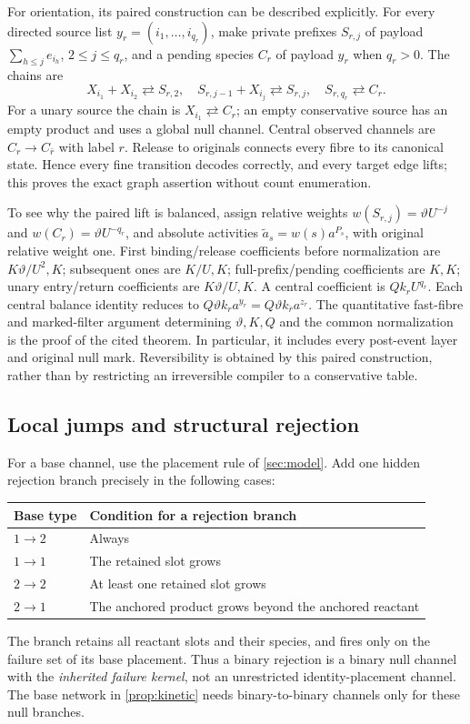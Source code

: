 \documentclass[11pt]{article}
\numberwithin{equation}{section}
\theoremstyle{definition}
\theoremstyle{remark}\newtheorem{remark}[theorem]{Remark}
\begin{document}
For orientation, its paired construction can be described explicitly.
For every directed source list $y_r=(i_1,\ldots,i_{q_r})$, make private
prefixes $S_{r,j}$ of payload $\sum_{h\le j}e_{i_h}$, $2\le j\le q_r$,
and a pending species $C_r$ of payload $y_r$ when $q_r>0$. The chains are
\[
 X_{i_1}+X_{i_2}\rightleftarrows S_{r,2},\quad
 S_{r,j-1}+X_{i_j}\rightleftarrows S_{r,j},\quad
 S_{r,q_r}\rightleftarrows C_r.
\]
For a unary source the chain is $X_{i_1}\rightleftarrows C_r$; an empty
conservative source has an empty product and uses a global null channel.
Central observed channels are $C_r\to C_{\bar r}$ with label $r$.
Release to originals connects every fibre to its canonical state.
Hence every fine transition decodes correctly, and every target edge lifts;
this proves the exact graph assertion without count enumeration.

To see why the paired lift is balanced, assign relative weights
$w(S_{r,j})=\vartheta U^{-j}$ and
$w(C_r)=\vartheta U^{-q_r}$, and absolute activities
$\widetilde a_s=w(s)a^{P_s}$, with original relative weight one.
First binding/release coefficients before normalization are
$K\vartheta/U^2,K$; subsequent ones are $K/U,K$; full-prefix/pending
coefficients are $K,K$; unary entry/return coefficients are
$K\vartheta/U,K$. A central coefficient is
$Qk_rU^{q_r}$. Each central balance identity reduces to
$Q\vartheta k_ra^{y_r}=Q\vartheta k_{\bar r}a^{z_r}$.
The quantitative fast-fibre and marked-filter argument determining
$\vartheta,K,Q$ and the common normalization is the proof of the cited
theorem. In particular, it includes every post-event layer and original
null mark. Reversibility is obtained by this paired construction, rather
than by restricting an irreversible compiler to a conservative table.

\subsection{Local jumps and structural rejection}
\label{sec:localjumps}

For a base channel, use the placement rule of \cref{sec:model}. Add one
hidden rejection branch precisely in the following cases:
\begin{center}\small
\begin{tabular}{@{}ll@{}}\toprule
Base type & Condition for a rejection branch\\\midrule
$1\to2$ & Always\\
$1\to1$ & The retained slot grows\\
$2\to2$ & At least one retained slot grows\\
$2\to1$ & The anchored product grows beyond the anchored reactant\\
\bottomrule\end{tabular}
\end{center}
The branch retains all reactant slots and their species, and fires only on
the failure set of its base placement. Thus a binary rejection is a binary
null channel with the \emph{inherited failure kernel}, not an unrestricted
identity-placement channel. The base network in \cref{prop:kinetic} needs
binary-to-binary channels only for these null branches.
\end{document}

